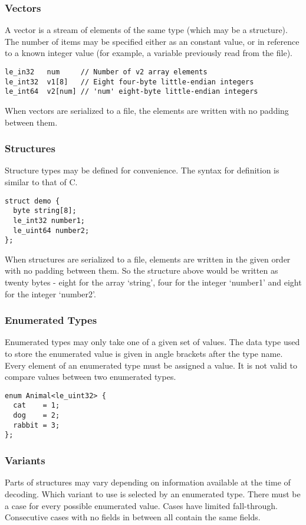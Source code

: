 \documentclass[10pt]{article}
\begin{document}
\subsubsection{Vectors}
A vector is a stream of elements of the same type (which may be a structure).
The number of items may be specified either as an constant value, or in reference to a known integer value (for
example, a variable previously read from the file).

\begin{verbatim}
le_in32   num     // Number of v2 array elements
le_int32  v1[8]   // Eight four-byte little-endian integers
le_int64  v2[num] // 'num' eight-byte little-endian integers
\end{verbatim}

When vectors are serialized to a file, the elements are written with no padding between them.

\subsubsection{Structures}
Structure types may be defined for convenience.
The syntax for definition is similar to that of C.

\begin{verbatim}
struct demo {
  byte string[8];
  le_int32 number1;
  le_uint64 number2;
};
\end{verbatim}

When structures are serialized to a file, elements are written in the given order with no padding between them.
So the structure above would be written as twenty bytes - eight for the array `string', four for the integer `number1'
and eight for the integer `number2'.

\subsubsection{Enumerated Types}
Enumerated types may only take one of a given set of values.
The data type used to store the enumerated value is given in angle brackets after the type name.
Every element of an enumerated type must be assigned a value.
It is not valid to compare values between two enumerated types.

\begin{verbatim}
enum Animal<le_uint32> {
  cat    = 1;
  dog    = 2;
  rabbit = 3;
};
\end{verbatim}

\subsubsection{Variants}
Parts of structures may vary depending on information available at the time of decoding.
Which variant to use is selected by an enumerated type.
There must be a case for every possible enumerated value.
Cases have limited fall-through.
Consecutive cases with no fields in between all contain the same fields.
\end{document}
